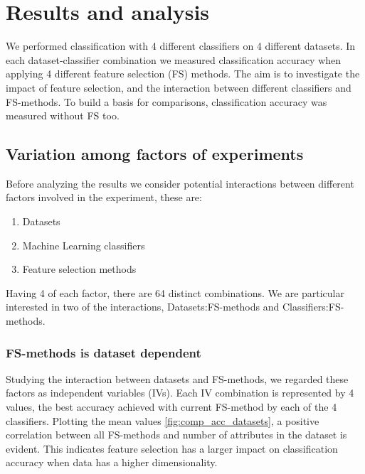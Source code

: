 \chapter{Results and analysis}

We performed classification with 4 different classifiers on 4 different datasets. In each dataset-classifier combination we measured classification accuracy when applying 4 different feature selection (FS) methods. The aim is to investigate the impact of feature selection, and the interaction between different classifiers and FS-methods. To build a basis for comparisons, classification accuracy was measured without FS too.

\section{Variation among factors of experiments}
\label{Variation_among_factors}

Before analyzing the results we consider potential interactions between different factors involved in the experiment, these are:

\begin{enumerate}
  \item Datasets
  \item Machine Learning classifiers
  \item Feature selection methods
\end{enumerate}

Having 4 of each factor, there are 64 distinct combinations. We are particular interested in two of the interactions, Datasets:FS-methods and Classifiers:FS-methods.

\subsection{FS-methods is dataset dependent}

Studying the interaction between datasets and FS-methods, we regarded these factors as independent variables (IVs). Each IV combination is represented by 4 values, the best accuracy achieved with current FS-method by each of the 4 classifiers. Plotting the mean values \ref{fig:comp_acc_datasets}, a positive correlation between all FS-methods and number of attributes in the dataset is evident. This indicates feature selection has a larger impact on classification accuracy when data has a higher dimensionality.



